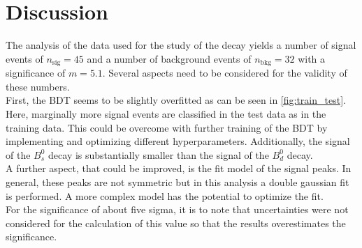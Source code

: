 \section{Discussion}
\label{sec:Discussion}
The analysis of the data used for the study of the decay \printBstoPsiKs \: yields a number of signal events of $n_\text{sig} = \num{45}$ and a number of background events of $n_\text{bkg} = \num{32}$
with a significance of $m = \num{5.1}$. Several aspects need to be considered for the validity of these numbers. \\
First, the BDT seems to be slightly overfitted as can be seen in \autoref{fig:train_test}. Here, marginally more signal events are classified in the test data as in the training data.
This could be overcome with further training of the BDT by implementing and optimizing different hyperparameters.
Additionally, the signal of the $B^0_s$ decay is substantially smaller than the signal of the $B^0_d$ decay. \\ %
A further aspect, that could be improved, is the fit model of the signal peaks. In general, these peaks are not symmetric but in this analysis a double gaussian fit is performed. A more complex model has 
the potential to optimize the fit. \\
For the significance of about five sigma, it is to note that uncertainties were not considered for the calculation of this value so that the results overestimates the significance.

%
%
